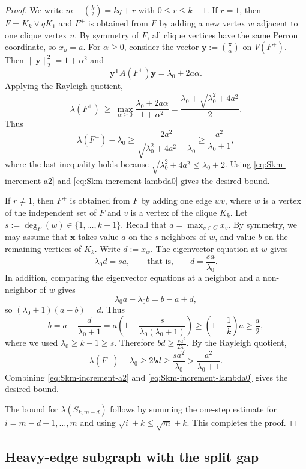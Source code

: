 \documentclass[10pt,a4paper]{amsart}
\begin{document}
\begin{proof}
We write $m-\binom{k}{2}=kq+r$ with $0\le r\le k-1$.
If $r=1$, then $F=K_k\vee qK_1$ and $F^+$ is obtained from $F$ by adding a new vertex $w$ adjacent to one clique vertex $u$.
By symmetry of $F$, all clique vertices have the same Perron coordinate, so $x_u=a$.
For $\alpha\ge 0$, consider the vector $\bm{y}:={\bm{x} \choose \alpha}$ on $V(F^+)$.
Then $\| \bm{y}\|_2^2=1+\alpha^2$ and
\[
        \bm{y}^{\mathsf T}A(F^+) \bm{y}=\lambda_0+2a\alpha.
\]
Applying the Rayleigh quotient,
\[
  \lambda(F^+)
  \ \ge\
  \max_{\alpha\ge 0}\frac{\lambda_0+2a\alpha}{1+\alpha^2}
  =
  \frac{\lambda_0+\sqrt{\lambda_0^2+4a^2}}{2}.
\]
Thus
\[
  \lambda(F^+)-\lambda_0
  \ge
  \frac{2a^2}{\sqrt{\lambda_0^2+4a^2}+\lambda_0}
  \ge
  \frac{a^2}{\lambda_0+1},
\]
where the last inequality holds because $\sqrt{\lambda_0^2+4a^2}\le \lambda_0+2$.
Using \eqref{eq:Skm-increment-a2} and \eqref{eq:Skm-increment-lambda0} gives the desired bound.

If $r\neq 1$, then $F^+$ is obtained from $F$ by adding one edge $wv$, where $w$ is a vertex of the independent set of $F$
and $v$ is a vertex of the clique $K_k$.
Let $s:=\deg_F(w)\in\{1,\dots,k-1\}$. 
Recall that $a=\max_{v\in C}x_v$. 
By symmetry, we may assume that $\bm{x}$ takes value $a$ on the $s$ neighbors of $w$, and value $b$ on the remaining vertices of $K_k$.  
Write $d:=x_w$.
The eigenvector equation at \(w\) gives
\[
        \lambda_0 d=sa,
        \qquad\text{that is,}\qquad
        d=\frac{sa}{\lambda_0}.
\]
In addition, comparing the eigenvector equations at a neighbor and a non-neighbor of $w$ gives 
\[
        \lambda_0 a - \lambda_0 b = b-a+d,
\]
so  $(\lambda_0+1)(a-b)=d.$
Thus
\[
  b
  =
  a-\frac{d}{\lambda_0+1}
  =
  a\left(1-\frac{s}{\lambda_0(\lambda_0+1)}\right)
  \ge
  \left(1-\frac1k \right)a
  \ge
  \frac{a}{2},
\]
where we used $\lambda_0\ge k-1 \ge s$.
Therefore $bd\ge \frac{sa^2}{2\lambda_0}$. By the Rayleigh quotient,
\[
  \lambda(F^+)-\lambda_0
  \ge
  2bd
  \ge
  \frac{sa^2}{\lambda_0}
  >
  \frac{a^2}{\lambda_0+1}.
\]
Combining \eqref{eq:Skm-increment-a2} and \eqref{eq:Skm-increment-lambda0} gives the desired bound. 

The bound for $\lambda(S_{k,m-d})$ follows by summing the one-step estimate for $i=m-d+1,\dots,m$ and using $\sqrt i+k\le \sqrt m+k$. This completes the proof.
\end{proof}

\subsection{Heavy-edge subgraph with the split gap}
\end{document}
